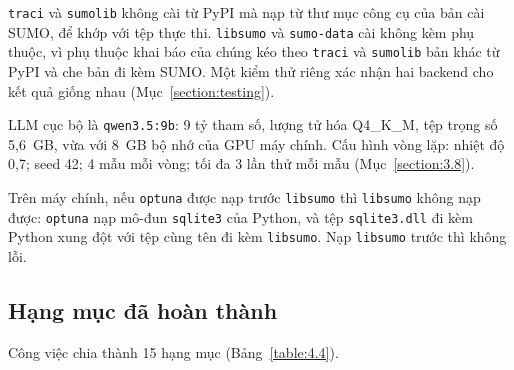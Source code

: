 \documentclass[../DoAn.tex]{subfiles}
\begin{document}
\texttt{traci} và \texttt{sumolib} không cài từ PyPI mà nạp từ thư mục công cụ của bản cài SUMO, để khớp với tệp thực thi. \texttt{libsumo} và \texttt{sumo-data} cài không kèm phụ thuộc, vì phụ thuộc khai báo của chúng kéo theo \texttt{traci} và \texttt{sumolib} bản khác từ PyPI và che bản đi kèm SUMO. Một kiểm thử riêng xác nhận hai backend cho kết quả giống nhau (Mục~\ref{section:testing}).

LLM cục bộ là \texttt{qwen3.5:9b}: 9 tỷ tham số, lượng tử hóa Q4\_K\_M, tệp trọng số 5,6~GB, vừa với 8~GB bộ nhớ của GPU máy chính. Cấu hình vòng lặp: nhiệt độ 0,7; seed 42; 4 mẫu mỗi vòng; tối đa 3 lần thử mỗi mẫu (Mục~\ref{section:3.8}).

Trên máy chính, nếu \texttt{optuna} được nạp trước \texttt{libsumo} thì \texttt{libsumo} không nạp được: \texttt{optuna} nạp mô-đun \texttt{sqlite3} của Python, và tệp \texttt{sqlite3.dll} đi kèm Python xung đột với tệp cùng tên đi kèm \texttt{libsumo}. Nạp \texttt{libsumo} trước thì không lỗi.

\subsection{Hạng mục đã hoàn thành}

Công việc chia thành 15 hạng mục (Bảng~\ref{table:4.4}).
\end{document}
